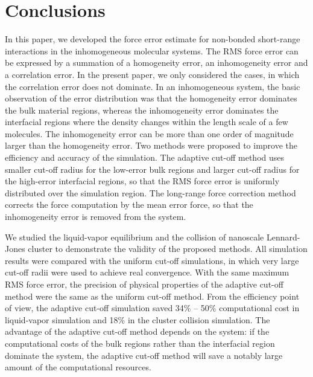 \documentclass[aps, pre, preprint]{revtex4}
\begin{document}
\section{Conclusions}\label{sec:conclusion}

In this paper, we developed the force error estimate for non-bonded
short-range interactions in the inhomogeneous molecular systems. The
RMS force error can be expressed by a summation of a homogeneity
error, an inhomogeneity error and a correlation error. In the present
paper, we only considered the cases, in which the correlation error
does not dominate. In an inhomogeneous system, the basic observation
of the error distribution was that the homogeneity error dominates the
bulk material regions, whereas the inhomogeneity error dominates the
interfacial regions where the density changes within the length scale
of a few molecules. The inhomogeneity error can be more than one
order of magnitude larger than the homogeneity error.  Two methods
were proposed to improve the efficiency and accuracy of the
simulation. The adaptive cut-off method uses smaller cut-off radius
for the low-error bulk regions and larger cut-off radius for the
high-error interfacial regions, so that the RMS force error is
uniformly distributed over the simulation region. The long-range force
correction method corrects the force computation by the mean error
force, so that the inhomogeneity error is removed from the system.

We studied the liquid-vapor equilibrium and the collision of nanoscale
Lennard-Jones cluster to demonstrate the validity of the proposed
methods.  All simulation results were compared with the uniform
cut-off simulations, in which very large cut-off radii were used to
achieve real convergence.  With the same maximum RMS force error,
the precision of physical properties of the adaptive cut-off method
were the same as the uniform cut-off method. From the efficiency
point of view,
the adaptive cut-off simulation saved 34\% -- 50\% computational cost
in liquid-vapor simulation and 18\% in the cluster collision simulation.
The advantage of the adaptive cut-off method depends on the
system:{
  if the computational costs of the bulk regions rather than the
  interfacial region dominate the system,}
the adaptive cut-off method will save a notably large amount of the
computational resources.
\end{document}
